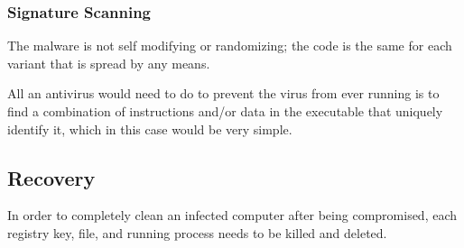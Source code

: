 \documentclass[11pt]{article}
\begin{document}
\subsubsection{Signature Scanning}
\label{sec:org960893d}
The malware is not self modifying or randomizing; the code is the same
for each variant that is spread by any means.

All an antivirus would need to do to prevent the virus from ever
running is to find a combination of instructions and/or data in the
executable that uniquely identify it, which in this case would be very
simple.
\subsection{Recovery}
\label{sec:orgdd3de48}
In order to completely clean an infected computer after being
compromised, each registry key, file, and running process needs to be
killed and deleted.
\end{document}
